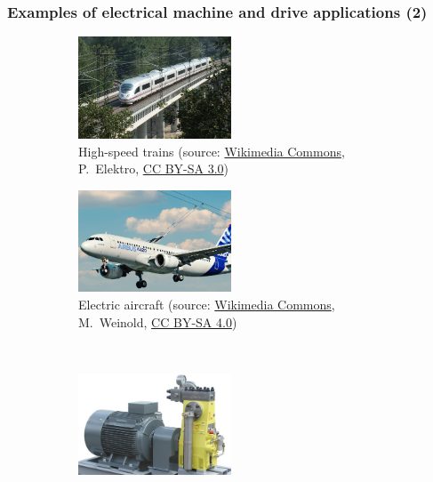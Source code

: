 \begin{frame}
	\frametitle{Examples of electrical machine and drive applications (2)}
	\begin{figure}
		\ContinuedFloat
		\centering
		\begin{subfigure}[b]{0.49\textwidth}
			\centering
			\includegraphics[width=0.5\textwidth]{fig/lec01/Train.jpg}
			\caption{High-speed trains (source: \href{https://commons.wikimedia.org/wiki/File:Fast_Train_Spain_Class_103_AVE_Siemens_Bridge_Macanet-Massanes.JPG}{Wikimedia Commons}, P.~Elektro, \href{https://creativecommons.org/licenses/by-sa/3.0/deed.en}{CC BY-SA 3.0})}
		\end{subfigure}
		\hfill
		\begin{subfigure}[b]{0.49\textwidth}
			\centering
			\includegraphics[width=0.5\textwidth]{fig/lec01/Electric_Airbus_A320.jpg}
			\caption{Electric aircraft (source: \href{https://commons.wikimedia.org/wiki/File:Electric_Airbus_A320.jpg}{Wikimedia Commons}, M.~Weinold, \href{https://creativecommons.org/licenses/by-sa/4.0/deed.en}{CC BY-SA 4.0})}
		\end{subfigure}
		\\
		\begin{subfigure}[b]{0.49\textwidth}
			\centering
			\includegraphics[width=0.5\textwidth]{fig/lec01/Pump.jpg}

\end{subfigure}
\end{figure}
\end{frame}
